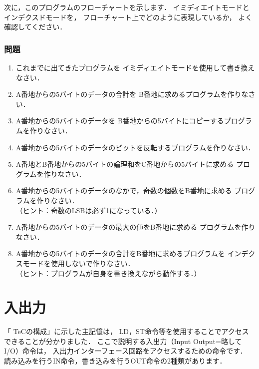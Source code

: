 次に，このプログラムのフローチャートを示します．
イミディエイトモードとインデクスドモードを，
フローチャート上でどのように表現しているか，
よく確認してください．

\begin{center}
\end{center}

\newpage
\subsubsection{問題}
\begin{enumerate}
\item これまでに出てきたプログラムを
イミディエイトモードを使用して書き換えなさい．
\item A番地からの5バイトのデータの合計を
B番地に求めるプログラムを作りなさい．
\item A番地からの5バイトのデータを
B番地からの5バイトにコピーするプログラムを作りなさい．
\item A番地からの5バイトのデータのビットを反転するプログラムを作りなさい．
\item A番地とB番地からの5バイトの論理和をC番地からの5バイトに求める
プログラムを作りなさい．
\item A番地からの5バイトのデータのなかで，奇数の個数をB番地に求める
プログラムを作りなさい．\\
（ヒント：奇数のLSBは必ず1になっている．）
\item A番地からの5バイトのデータの最大の値をB番地に求める
プログラムを作りなさい．
\item A番地からの5バイトのデータの合計をB番地に求めるプログラムを
インデクスモードを使用しないで作りなさい．\\
（ヒント：プログラムが自身を書き換えながら動作する．）
\end{enumerate}

\newpage
\section{入出力}
「 TeCの構成」に示した主記憶は，
LD，ST命令等を使用することでアクセスできることが分かりました．
ここで説明する入出力（Input Output=略して I/O）命令は，
入出力インターフェース回路をアクセスするための命令です．
読み込みを行うIN命令，書き込みを行うOUT命令の2種類があります．

